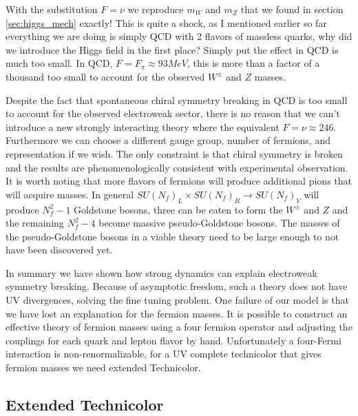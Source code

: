 With the substitution $F=\nu$ we reproduce $m_W$ and $m_Z$ that we found in section \ref{sec:higgs_mech} exactly!
This is quite a shock, as I mentioned earlier so far everything we are doing is simply QCD with 2 flavors of massless quarks, why did we introduce the Higgs field in the first place?
Simply put the effect in QCD is much too small.
In QCD, $F=F_\pi\approx93MeV$, this is more than a factor of a thousand too small to account for the observed $W^\pm$ and $Z$ masses.

Despite the fact that spontaneous chiral symmetry breaking in QCD is too small to account for the observed electroweak sector, there is no reason that we can't introduce a new strongly interacting theory where the equivalent $F=\nu\approx246$.
Furthermore we can choose a different gauge group, number of fermions, and representation if we wish.
The only constraint is that chiral symmetry is broken and the results are phenomenologically consistent with experimental observation.
It is worth noting that more flavors of fermions will produce additional pions that will acquire masses.
In general $SU(N_f)_L\times SU(N_f)_R\rightarrow SU(N_f)_V$ will produce $N^2_f-1$ Goldstone bosons, three can be eaten to form the $W^\pm$ and $Z$ and the remaining $N_f^2-4$ become massive pseudo-Goldstone bosons.
The masses of the pseudo-Goldstone bosons in a viable theory need to be large enough to not have been discovered yet.

In summary we have shown how strong dynamics can explain electroweak symmetry breaking.
Because of asymptotic freedom, such a theory does not have UV divergences, solving the fine tuning problem.
One failure of our model is that we have lost an explanation for the fermion masses.
It is possible to construct an effective theory of fermion masses using a four fermion operator and adjusting the couplings for each quark and lepton flavor by hand.
Unfortunately a four-Fermi interaction is non-renormalizable, for a UV complete technicolor that gives fermion masses we need extended Technicolor.

\subsection{Extended Technicolor}

